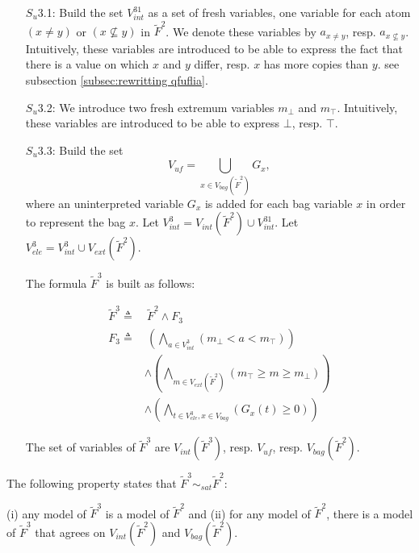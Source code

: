 \begin{enumerate}
\item[$S_u$3.1:] Build the set $V^{31}_{int}$ as a set of fresh variables, one variable for each atom $(x \neq y)$ or $(x \nsubseteq y)$ in $\tilde{F}^2$.
We denote these variables by $a_{x \neq y}$, resp. $a_{x \nsubseteq y}$.
Intuitively, these variables are introduced to be able to express the fact that there is a value on which $x$ and $y$ differ, resp. $x$ has more copies than $y$.
see subsection \ref{subsec:rewritting qfuflia}.

\item[$S_u$3.2:] We introduce two fresh extremum variables $m_{\bot}$ and $m_{\top}$.
Intuitively, these variables are introduced to be able to express $\bot$, resp. $\top$.

\item[$S_u$3.3:] Build the set
$$V_{\textit{uf}}  =
\bigcup_{x\in V_{bag}(\tilde{F}^2)} G_{x},$$
where an uninterpreted variable $G_{x}$ is added for each bag variable $x$ in order to represent the bag $x$.
Let $V^3_{int} = V_{int}(\tilde{F}^2) \cup V^{31}_{int}$.
Let $V^3_{ele} = V^3_{int} \cup V_{ext}(\tilde{F}^2)$.

The formula $\tilde{F}^3$ is built as follows:
\begin{small}
\begin{align}
  \tilde{F}^3 \triangleq &\
  \tilde{F}^2 \land F_{3} \\
  F_{3 } \triangleq &\
  \left(\bigwedge_{a \in V^{3}_{int}}(m_{\bot} < a < m_{\top})\right)
  \\
  & \land
  \left(\bigwedge_{m \in V_{ext}(\tilde{F}^2)}(m_{\top} \ge m \ge m_{\bot})\right)
  \\
  & \land
  \left(\bigwedge_{t \in V^3_{ele},x \in V_{bag}}(G_{x}(t) \ge 0)\right)
\end{align}
\end{small}
The set of variables of $\tilde{F}^3$ are $V_{int}(\tilde{F}^3)$, resp. $V_{\textit{uf}}$, resp. $V_{bag}(\tilde{F}^2)$.
\end{enumerate}

The following property states that $\tilde{F}^3 \sim_{sat} \tilde{F}^2$:
\begin{myprop}
\label{prop:order:countabs}
(i) any model of $\tilde{F}^3$ is a model of $\tilde{F}^2$ and
(ii) for any model of $\tilde{F}^2$, there is a model of $\tilde{F}^3$ that agrees on $V_{int}(\tilde{F}^2)$ and $V_{bag}(\tilde{F}^2)$.
\end{myprop}




